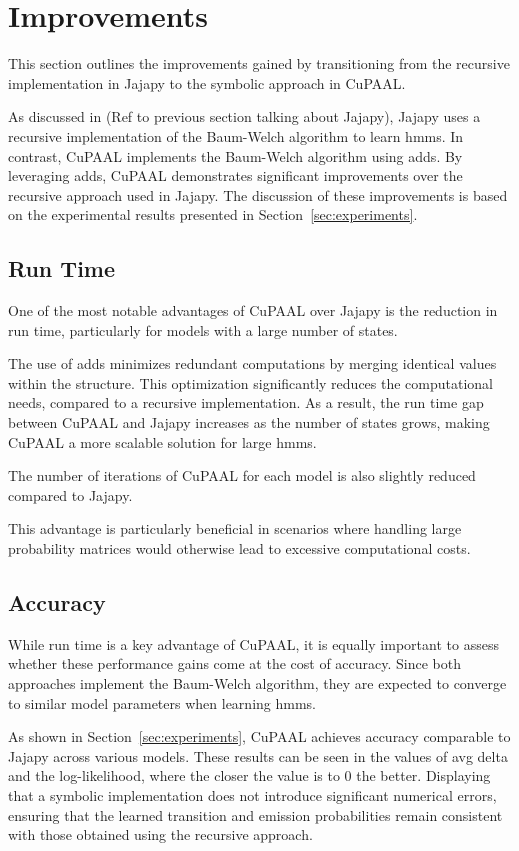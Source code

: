 \section{Improvements}\label{sec:improvements}
This section outlines the improvements gained by transitioning from the recursive implementation in Jajapy to the symbolic approach in CuPAAL.

As discussed in (Ref to previous section talking about Jajapy), Jajapy uses a recursive implementation of the Baum-Welch algorithm to learn \glspl{hmm}.
In contrast, CuPAAL implements the Baum-Welch algorithm using \glspl{add}.
By leveraging \glspl{add}, CuPAAL demonstrates significant improvements over the recursive approach used in Jajapy.
The discussion of these improvements is based on the experimental results presented in Section~\ref{sec:experiments}.

\subsection{Run Time}\label{subsec:improvements_run_time}
One of the most notable advantages of CuPAAL over Jajapy is the reduction in run time, particularly for models with a large number of states.

The use of \glspl{add} minimizes redundant computations by merging identical values within the structure.
This optimization significantly reduces the computational needs, compared to a recursive implementation.
As a result, the run time gap between CuPAAL and Jajapy increases as the number of states grows, making CuPAAL a more scalable solution for large \glspl{hmm}.

The number of iterations of CuPAAL for each model is also slightly reduced compared to Jajapy.

This advantage is particularly beneficial in scenarios where handling large probability matrices would otherwise lead to excessive computational costs.


\subsection{Accuracy}\label{subsec:improvements_accuracy}
While run time is a key advantage of CuPAAL, it is equally important to assess whether these performance gains come at the cost of accuracy.
Since both approaches implement the Baum-Welch algorithm, they are expected to converge to similar model parameters when learning \glspl{hmm}.

As shown in Section~\ref{sec:experiments}, CuPAAL achieves accuracy comparable to Jajapy across various models.
These results can be seen in the values of avg delta and the log-likelihood, where the closer the value is to 0 the better.
Displaying that a symbolic implementation does not introduce significant numerical errors, ensuring that the learned transition and emission probabilities remain consistent with those obtained using the recursive approach.

